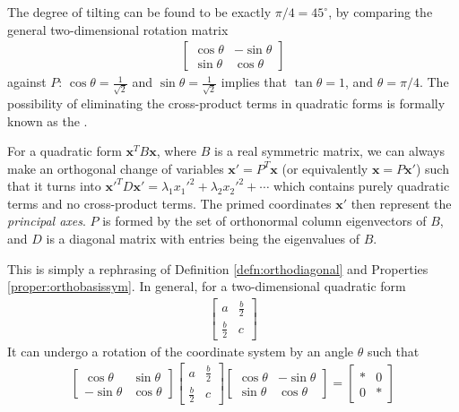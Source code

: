 The degree of tilting can be found to be exactly $\pi/4 = 45^{\circ}$, by comparing the general two-dimensional rotation matrix
\begin{align*}
\begin{bmatrix}
\cos \theta & -\sin \theta \\
\sin \theta & \cos \theta
\end{bmatrix}
\end{align*}
against $P$: $\cos \theta = \frac{1}{\sqrt{2}}$ and $\sin \theta = \frac{1}{\sqrt{2}}$ implies that $\tan \theta = 1$, and $\theta = \pi/4$. The possibility of eliminating the cross-product terms in quadratic forms is formally known as the .

\begin{thm}
For a quadratic form $\textbf{x}^TB\textbf{x}$, where $B$ is a real symmetric matrix, we can always make an orthogonal change of variables $\textbf{x}' = P^T\textbf{x}$ (or equivalently $\textbf{x} = P\textbf{x}'$) such that it turns into $\textbf{x}'^TD\textbf{x}' = \lambda_1 x_1'^2 + \lambda_2 x_2'^2 + \cdots$ which contains purely quadratic terms and no cross-product terms. The primed coordinates $\textbf{x}'$ then represent the \textit{principal axes}. $P$ is formed by the set of orthonormal column eigenvectors of $B$, and $D$ is a diagonal matrix with entries being the eigenvalues of $B$.
\end{thm}
This is simply a rephrasing of Definition \ref{defn:orthodiagonal} and Properties \ref{proper:orthobasissym}. In general, for a two-dimensional quadratic form
\begin{align*}
\begin{bmatrix}
a & \frac{b}{2} \\
\frac{b}{2} & c
\end{bmatrix}
\end{align*}
It can undergo a rotation of the coordinate system by an angle $\theta$ such that
\begin{align}
\begin{bmatrix}
\cos \theta & \sin \theta \\
-\sin \theta & \cos \theta
\end{bmatrix}
\begin{bmatrix}
a & \frac{b}{2} \\
\frac{b}{2} & c
\end{bmatrix}
\begin{bmatrix}
\cos \theta & -\sin \theta \\
\sin \theta & \cos \theta
\end{bmatrix}
=
\begin{bmatrix}
* & 0\\
0 & *
\end{bmatrix}
\label{eqn:rotate2dquadmat}
\end{align}

